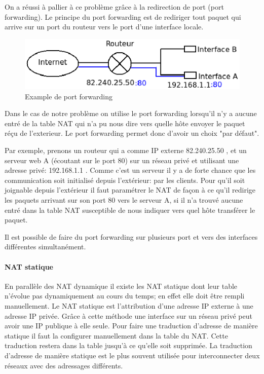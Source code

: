On a réussi à pallier à ce problème grâce à la redirection de port (port
forwarding).  Le principe du port forwarding est de rediriger tout paquet qui
arrive sur un port du routeur vers le port d'une interface locale.

\begin{figure}[h]
\centering
\includegraphics{./pics/port_forwarding.eps}
\caption{Example de port forwarding}
\label{fig:portfow}
\end{figure}

Dans le cas de notre problème on utilise le port forwarding lorsqu'il n'y a
aucune entré de la table NAT qui n'a pu nous dire vers quelle hôte envoyer le
paquet réçu de l'exterieur.  Le port forwarding permet donc d'avoir un choix
"par défaut".

Par exemple, prenons un routeur qui a comme IP externe 82.240.25.50 , et un
serveur web A (écoutant sur le port 80) sur un réseau privé et utilisant une
adresse privé: 192.168.1.1 . Comme c'est un serveur il y a de forte chance que
les communication soit initialisé depuis l'extérieur: par les clients.  Pour
qu'il soit joignable depuis l'extérieur il faut paramétrer le NAT de façon à ce
qu'il redirige les paquets arrivant sur son port 80 vers le serveur A, si il
n'a trouvé aucune entré dans la table NAT susceptible de nous indiquer vers
quel hôte transférer le paquet.


Il est possible de faire du port forwarding sur plusieurs port et vers des
interfaces différentes simultanément.

\paragraph{NAT statique} En parallèle des NAT dynamique il existe les NAT
statique dont leur table n'évolue pas dynamiquement au cours du temps; en effet
elle doit être rempli manuellement.
Le NAT statique est l'attribution d'une adresse IP externe à une adresse IP
privée. Grâce à cette méthode une interface sur un réseau privé peut avoir une
IP publique à elle seule. Pour faire une traduction d'adresse de manière
statique il faut la configurer manuellement dans la table du NAT. Cette
traduction restera dans la table jusqu'à ce qu'elle soit supprimée. La
traduction d'adresse de manière statique est le plus souvent utilisée pour
interconnecter deux réseaux avec des adressages différents.

